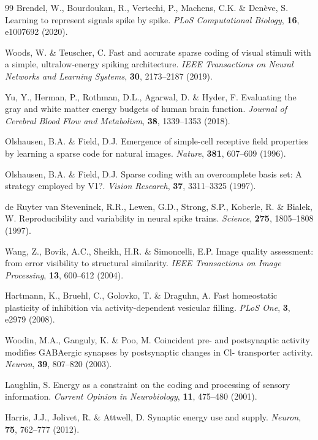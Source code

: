 \begin{thebibliography}{99}
 Brendel, W., Bourdoukan, R., Vertechi, P., Machens, C.K. \& Den{\`e}ve, S. Learning to represent signals spike by spike. \emph{PLoS Computational Biology}, \textbf{16}, e1007692 (2020).

 Woods, W. \& Teuscher, C. Fast and accurate sparse coding of visual stimuli with a simple, ultralow-energy spiking architecture. \emph{IEEE Transactions on Neural Networks and Learning Systems}, \textbf{30}, 2173--2187 (2019).

 Yu, Y., Herman, P., Rothman, D.L., Agarwal, D. \& Hyder, F. Evaluating the gray and white matter energy budgets of human brain function. \emph{Journal of Cerebral Blood Flow and Metabolism}, \textbf{38}, 1339--1353 (2018).

 Olshausen, B.A. \& Field, D.J. Emergence of simple-cell receptive field properties by learning a sparse code for natural images. \emph{Nature}, \textbf{381}, 607--609 (1996).

 Olshausen, B.A. \& Field, D.J. Sparse coding with an overcomplete basis set: A strategy employed by V1?. \emph{Vision Research}, \textbf{37}, 3311--3325 (1997).

 de Ruyter van Steveninck, R.R., Lewen, G.D., Strong, S.P., Koberle, R. \& Bialek, W. Reproducibility and variability in neural spike trains. \emph{Science}, \textbf{275}, 1805--1808 (1997).

 Wang, Z., Bovik, A.C., Sheikh, H.R. \& Simoncelli, E.P. Image quality assessment: from error visibility to structural similarity. \emph{IEEE Transactions on Image Processing}, \textbf{13}, 600--612 (2004).

 Hartmann, K., Bruehl, C., Golovko, T. \& Draguhn, A. Fast homeostatic plasticity of inhibition via activity-dependent vesicular filling. \emph{PLoS One}, \textbf{3}, e2979 (2008).

 Woodin, M.A., Ganguly, K. \& Poo, M. Coincident pre- and postsynaptic activity modifies GABAergic synapses by postsynaptic changes in Cl- transporter activity. \emph{Neuron}, \textbf{39}, 807--820 (2003).

 Laughlin, S. Energy as a constraint on the coding and processing of sensory information. \emph{Current Opinion in Neurobiology}, \textbf{11}, 475--480 (2001).

 Harris, J.J., Jolivet, R. \& Attwell, D. Synaptic energy use and supply. \emph{Neuron}, \textbf{75}, 762--777 (2012).


\end{thebibliography}
